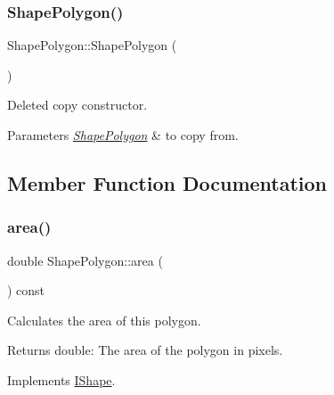 \subsubsection{\texorpdfstring{ShapePolygon()}{ShapePolygon()}\hspace{0.1cm}{\footnotesize\ttfamily [2/2]}}
{\footnotesize\ttfamily Shape\+Polygon\+::\+Shape\+Polygon (\begin{DoxyParamCaption}\item[{const \mbox{\hyperlink{class_shape_polygon}{Shape\+Polygon}} \&}]{ }\end{DoxyParamCaption})\hspace{0.3cm}{\ttfamily [delete]}}



Deleted copy constructor. 


\begin{DoxyParams}{Parameters}
{\em \mbox{\hyperlink{class_shape_polygon}{Shape\+Polygon}}} & to copy from. \\
\hline
\end{DoxyParams}


\subsection{Member Function Documentation}
\mbox{\label{class_shape_polygon_a60c6cad5af503e0c405523a06e9471eb}} 
\subsubsection{\texorpdfstring{area()}{area()}}
{\footnotesize\ttfamily double Shape\+Polygon\+::area (\begin{DoxyParamCaption}{ }\end{DoxyParamCaption}) const\hspace{0.3cm}{\ttfamily [virtual]}}



Calculates the area of this polygon. 

\begin{DoxyReturn}{Returns}
double\+: The area of the polygon in pixels. 
\end{DoxyReturn}


Implements \mbox{\hyperlink{class_i_shape_aed742a160acdd13c9cfdeb16e605afea}{I\+Shape}}.

\mbox{\label{class_shape_polygon_a6f4ed4749a739aaf44b5680d75ae8538}} 
